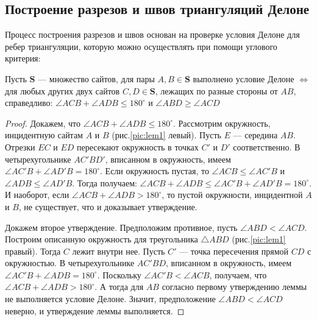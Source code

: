 \documentclass[12pt]{article}
\begin{document}
\subsection{Построение разрезов и швов триангуляций Делоне}
Процесс построения разрезов и швов основан на проверке условия Делоне для ребер триангуляции,
которую можно осуществлять при помощи углового критерия:

\begin{lemma}
\label{th:lem1}
Пусть $\textbf{S}$ --- множество сайтов, для пары $A, B \in \textbf{S}$ выполнено условие Делоне $\Leftrightarrow$
для любых других двух сайтов $C, D \in \textbf{S}$, лежащих по разные стороны от $AB$, справедливо:
$\angle ACB + \angle ADB \le 180^\circ$ и $\angle ABD \ge \angle ACD$
\end{lemma}

\begin{proof}
Докажем, что $\angle ACB + \angle ADB \le 180^\circ$.
Рассмотрим окружность, инцидентную сайтам $A$ и $B$ (рис.\ref{pic:lem1} левый).
Пусть $E$ --- середина $AB$.
Отрезки $EC$ и $ED$ пересекают окружность в точках $C'$ и $D'$ соответственно.
В четырехугольнике $AC'BD'$, вписанном в окружность, имеем $\angle AC'B+\angle AD'B = 180^\circ$.
Если окружность пустая, то $\angle ACB \le \angle AC'B$ и $\angle ADB \le \angle AD'B$.
Тогда получаем: $\angle ACB + \angle ADB \le \angle AC'B + \angle AD'B = 180^\circ$.
И наоборот, если $\angle ACB + \angle ADB > 180^\circ$, то пустой окружности, инцидентной $A$ и $B$, не существует, что и доказывает утверждение.

Докажем второе утверждение.
Предположим противное, пусть $\angle ABD < \angle ACD$.
Построим описанную окружность для треугольника $\triangle ABD$ (рис.\ref{pic:lem1} правый).
Тогда $C$ лежит внутри нее.
Пусть $C'$ --- точка пересечения прямой $CD$ с окружностью.
В четырехугольнике $AC'BD$, вписанном в окружность, имеем $\angle AC'B + \angle ADB = 180^\circ$.
Поскольку $\angle AC'B < \angle ACB$, получаем, что $\angle ACB + \angle ADB > 180^\circ$.
А тогда для $AB$ согласно первому утверждению леммы не выполняется условие Делоне.
Значит, предположение $\angle ABD < \angle ACD$ неверно, и утверждение леммы выполняется.
\end{proof}
\end{document}
